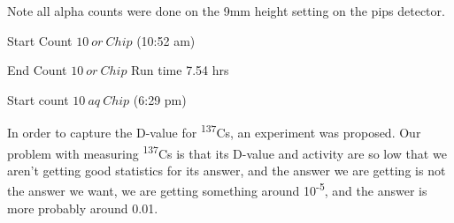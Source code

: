 \documentclass[idxtotoc,hyperref,openany,oneside]{labbook} %
\newcommand{\cmark}{\ding{51}}%
\newcommand{\done}{\rlap{$\square$}{\raisebox{2pt}{\large\hspace{1pt}\cmark}}%
  \hspace{-2.5pt}}
\newcommand{\tss}{\textsuperscript}
\begin{document}



Note all alpha counts were done on the 9mm height setting
on the pips detector.
\begin{todolist}
\item[\done]{Start Count $\boxed{10\ or\ Chip}$ (10:52 am)}
\item[\done]{End Count $\boxed{10\ or\ Chip}$ Run time 7.54 hrs}
\item[\done]{Start count $\boxed{10\ aq\ Chip}$ (6:29 pm)}
\end{todolist}



In order to capture the D-value for \tss{137}Cs,
an experiment was proposed. Our problem with measuring
\tss{137}Cs is that its D-value and activity are so low
that we aren't getting good statistics for its answer,
and the answer we are getting is not the answer we want,
we are getting something around 10\tss{-5}, and the answer
is more probably around 0.01.
\vspace{0.3cm}
\end{document}
